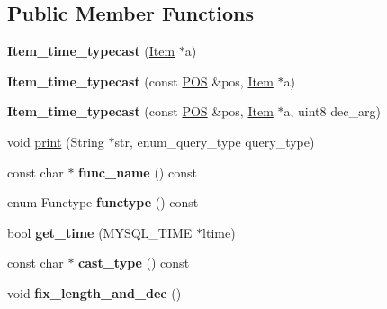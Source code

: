 \subsection*{Public Member Functions}
\begin{DoxyCompactItemize}
\item 
\mbox{\label{classItem__time__typecast_a98d6fbb01f99eb6e18fbbf42b4f59ecb}} 
{\bfseries Item\+\_\+time\+\_\+typecast} (\mbox{\hyperlink{classItem}{Item}} $\ast$a)
\item 
\mbox{\label{classItem__time__typecast_a59b5374a0b28786d6cea79a89d5f1089}} 
{\bfseries Item\+\_\+time\+\_\+typecast} (const \mbox{\hyperlink{structYYLTYPE}{P\+OS}} \&pos, \mbox{\hyperlink{classItem}{Item}} $\ast$a)
\item 
\mbox{\label{classItem__time__typecast_aabdfd1092faf64ca4318a0bfcd413dc3}} 
{\bfseries Item\+\_\+time\+\_\+typecast} (const \mbox{\hyperlink{structYYLTYPE}{P\+OS}} \&pos, \mbox{\hyperlink{classItem}{Item}} $\ast$a, uint8 dec\+\_\+arg)
\item 
void \mbox{\hyperlink{classItem__time__typecast_aee10e9840d9d9bce9887ac3d49f8729c}{print}} (String $\ast$str, enum\+\_\+query\+\_\+type query\+\_\+type)
\item 
\mbox{\label{classItem__time__typecast_a712106cf996644e616e76df0ef4a00a8}} 
const char $\ast$ {\bfseries func\+\_\+name} () const
\item 
\mbox{\label{classItem__time__typecast_aae40e58e3056ebdc78aa022199deea7a}} 
enum Functype {\bfseries functype} () const
\item 
\mbox{\label{classItem__time__typecast_a01276429c56b858b3342fc4ab8550ef9}} 
bool {\bfseries get\+\_\+time} (M\+Y\+S\+Q\+L\+\_\+\+T\+I\+ME $\ast$ltime)
\item 
\mbox{\label{classItem__time__typecast_a50ac8843d4971e67ec3a4c150ffac006}} 
const char $\ast$ {\bfseries cast\+\_\+type} () const
\item 
\mbox{\label{classItem__time__typecast_ac1423aa0a801864bd9e55068eaa240b4}} 
void {\bfseries fix\+\_\+length\+\_\+and\+\_\+dec} ()
\end{DoxyCompactItemize}

